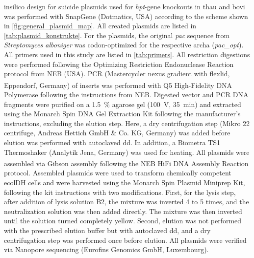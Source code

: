 \Gls{insilico} design for suicide plasmids used for \textit{hpt}-gene knockouts in \acrshort{thau} and \acrshort{bovi} was performed with SnapGene (Dotmatics, USA) according to the scheme shown in \cref{fig:general_plasmid_map}. All created plasmids are listed in \cref{tab:plasmid_konstrukte}. For the plasmids, the original \textit{pac} sequence from \textit{Streptomyces alboniger} was codon-optimized for the respective \gls{archa} (\textit{pac\_opt}). All primers used in this study are listed in \cref{tab:primers}. All restriction digestions were performed following the Optimizing Restriction Endonuclease Reaction protocol from NEB (USA). PCR (Mastercycler nexus gradient with flexlid, Eppendorf, Germany) of inserts was performed with Q5\textsuperscript{\textregistered} High-Fidelity DNA Polymerase following the instructions from NEB. Digested vector and PCR DNA fragments were purified on a 1.5~\% agarose gel (100~V, 35~min) and extracted using the Monarch Spin DNA Gel Extraction Kit following the manufacturer's instructions, excluding the elution step. Here, a dry centrifugation step (Mikro 22 centrifuge, Andreas Hettich GmbH \& Co. KG, Germany) was added before elution was performed with autoclaved dd. In addition, a Biometra TS1 Thermoshaker (Analytik Jena, Germany) was used for heating. All plasmids were assembled via Gibson assembly following the NEB\textsuperscript{\textregistered} HiFi DNA Assembly Reaction protocol. Assembled plasmids were used to transform chemically competent \acrshort{ecolDH} cells and were harvested using the Monarch Spin Plasmid Miniprep Kit, following the kit instructions with two modifications. First, for the lysis step, after addition of lysis solution B2, the mixture was inverted 4 to 5 times, and the neutralization solution was then added directly. The mixture was then inverted until the solution turned completely yellow. Second, elution was not performed with the prescribed elution buffer but with autoclaved dd, and a dry centrifugation step was performed once before elution. All plasmids were verified via Nanopore sequencing (Eurofins Genomics GmbH, Luxembourg).


